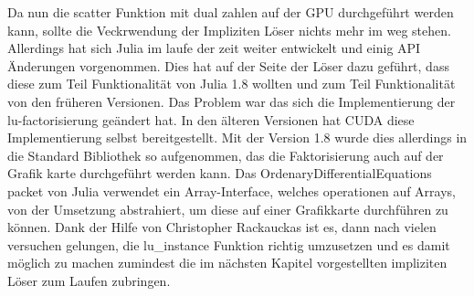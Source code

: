 Da nun die scatter Funktion mit dual zahlen auf der GPU durchgeführt werden kann, 
sollte die Veckrwendung der Impliziten Löser nichts mehr im weg stehen. %
Allerdings hat sich Julia im laufe der zeit weiter entwickelt und einig API Änderungen vorgenommen.
Dies hat auf der Seite der Löser dazu geführt, dass diese zum Teil Funktionalität von Julia 1.8 wollten und zum Teil Funktionalität von den früheren Versionen.
Das Problem war das sich die Implementierung der lu-factorisierung geändert hat. %
In den älteren Versionen hat CUDA diese Implementierung selbst bereitgestellt.
Mit der Version 1.8 wurde dies allerdings in die Standard Bibliothek so aufgenommen, das die Faktorisierung 
auch auf der Grafik karte durchgeführt werden kann.
Das OrdenaryDifferentialEquations packet von Julia verwendet 
ein Array-Interface, welches operationen auf Arrays, 
von der Umsetzung abstrahiert, um diese auf einer Grafikkarte durchführen zu können.
Dank der Hilfe von Christopher Rackauckas ist es, dann nach vielen versuchen gelungen, die lu\_instance Funktion richtig umzusetzen 
und es damit möglich zu machen zumindest die im nächsten Kapitel vorgestellten impliziten Löser zum Laufen zubringen.










